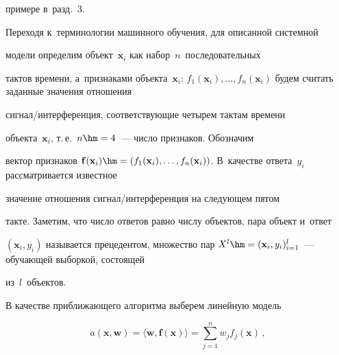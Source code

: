 примере в~разд.~3.


  


  Переходя к~терминологии машинного обуче\-ния, для описанной сис\-тем\-ной 


модели определим объект~$\mathbf{x}_i$ как набор~$n$~последовательных 


тактов времени, а~признаками объекта~$\mathbf{x}_i$: $f_1(\mathbf{x}_i), \ldots 


, f_n(\mathbf{x}_i)$ будем считать заданные значения отношения 


сигнал/интерференция, соответствующие четырем тактам времени 


объекта~$\mathbf{x}_i$, т.\,е.\ $n\hm=4$~--- число признаков. Обозначим 


вектор признаков $\mathbf{f}(\mathbf{x}_{i})\hm= (f_1(\mathbf{x}_i),\ldots 


, f_n(\mathbf{x}_i))$. В~качестве ответа~$y_i$ рассматривается известное 


значение отношения сиг\-нал\!/\!ин\-тер\-фе\-рен\-ция на сле\-ду\-ющем пятом 


такте. Заметим, что число ответов равно числу объектов, пара объект и~ответ 


$(\mathbf{x}_i, y_i)$ называется прецедентом, множество пар $X^l\hm= 


(\mathbf{x}_i, y_i)^l_{i=1}$~--- обучающей выборкой, состоящей 


из~$l$~объектов.


  


  В качестве приближающего алгоритма выберем линейную модель


  


  \noindent


  \begin{equation}


  a(\mathbf{x}, \mathbf{w})=\langle \mathbf{w},\mathbf{f}(\mathbf{x})\rangle= 


\sum\limits^n_{j=1} w_j f_j(\mathbf{x})\,,


  \label{e1-bob}


  \end{equation}


  


  \vspace*{-2pt}


  


